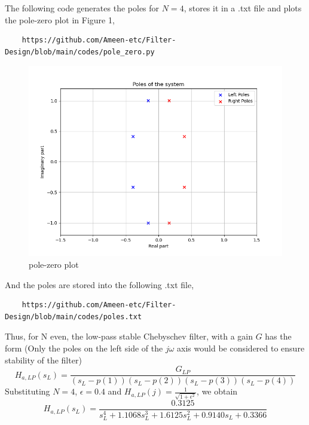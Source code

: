 \documentclass{article}
\begin{document}
\begin{enumerate}
The following code generates the poles for $N=4$, stores it in a .txt file and plots the pole-zero plot in Figure 1,
\begin{lstlisting}
    https://github.com/Ameen-etc/Filter-Design/blob/main/codes/pole_zero.py
\end{lstlisting}
\begin{figure}[h!]
    \centering
    \includegraphics[width=\columnwidth]{figs/pole-zero.png}
    \caption{pole-zero plot}
    \label{fig:p0}
\end{figure}
And the poles are stored into the following .txt file,
\begin{lstlisting}
    https://github.com/Ameen-etc/Filter-Design/blob/main/codes/poles.txt
\end{lstlisting}

Thus, for N even, the low-pass stable Chebyschev filter, with a gain $G$ has the form (Only the poles on the left side of the $j\omega$ axis would be considered to ensure stability of the filter)
\begin{equation}
\label{poleleft}
H_{a,LP}(s_L) = \frac{G_{LP}}{(s_L-p(1))(s_L-p(2))(s_L-p(3))(s_L-p(4))}
\end{equation}
Substituting $N = 4$, $\epsilon = 0.4$ and $H_{a,LP}(j) = \frac{1}{\sqrt{1+\epsilon^2}}$, we obtain 
\begin{equation}
\label{lpfinal}
H_{a,LP}(s_L) = \frac{0.3125}{s_L^4 + 1.1068s_L^3 + 1.6125s_L^2+0.9140s_L + 0.3366}
\end{equation}


\end{enumerate}
\end{document}
